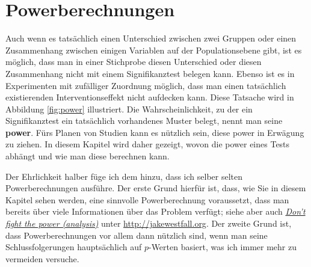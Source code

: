 \documentclass[oneside, 10pt]{book}\usepackage[]{graphicx}\usepackage[]{xcolor}
\begin{document}
\chapter{Powerberechnungen}\label{ch:poweranalysis}
Auch wenn es tatsächlich einen Unterschied zwischen zwei Gruppen
oder einen Zusammenhang zwischen einigen Variablen auf der Populationsebene
gibt, ist es möglich, dass man in einer Stichprobe diesen Unterschied
oder diesen Zusammenhang nicht mit einem Signifikanztest belegen kann.
Ebenso ist es in Experimenten mit zufälliger Zuordnung möglich,
dass man einen tatsächlich existierenden Interventionseffekt nicht aufdecken kann.
Diese Tatsache wird in Abbildung \vref{fig:power} illustriert.
Die Wahrscheinlichkeit, zu der ein Signifikanztest ein tatsächlich
vorhandenes Muster belegt, nennt man seine \textbf{power}.
Fürs Planen von Studien kann es nützlich sein, 
diese power in Erwägung zu ziehen. In diesem
Kapitel wird daher gezeigt, wovon die power eines Tests
abhängt und wie man diese berechnen kann.

Der Ehrlichkeit halber
füge ich dem hinzu, dass ich selber selten Powerberechnungen ausführe.
Der erste Grund hierfür ist, dass, wie Sie in diesem
Kapitel sehen werden, eine sinnvolle Powerberechnung voraussetzt,
dass man bereits über viele Informationen über das Problem verfügt;
siehe aber auch
\href{http://jakewestfall.org/blog/index.php/2015/06/16/dont-fight-the-power-analysis/}{\textit{Don't fight the power (analysis)}} 
unter \url{http://jakewestfall.org}.
Der zweite Grund ist, dass Powerberechnungen vor allem dann nützlich sind, wenn man
seine Schlussfolgerungen hauptsächlich auf $p$-Werten basiert,
was ich immer mehr zu vermeiden versuche.
\end{document}
